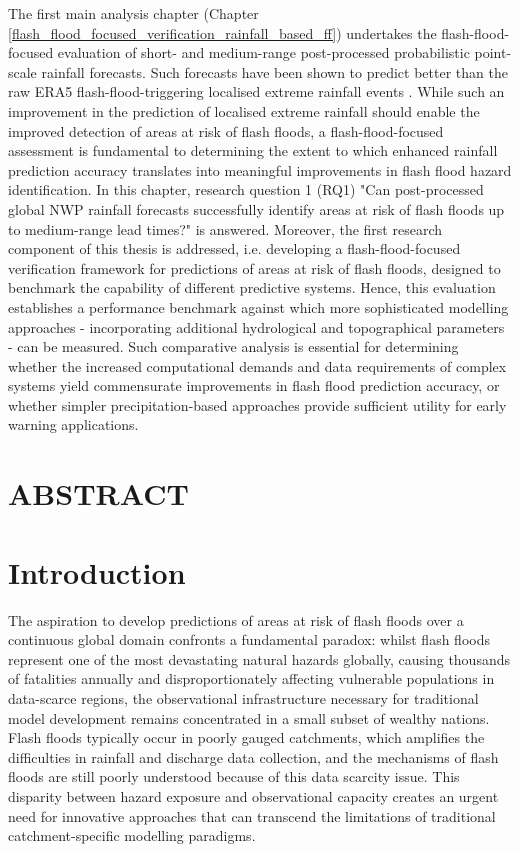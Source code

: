 The first main analysis chapter (Chapter \ref{flash_flood_focused_verification_rainfall_based_ff}) undertakes the flash-flood-focused evaluation of short- and medium-range post-processed probabilistic point-scale rainfall forecasts. Such forecasts have been shown to predict better than the raw ERA5 flash-flood-triggering localised extreme rainfall events \citep{Pillosu_2025a}. While such an improvement in the prediction of localised extreme rainfall should enable the improved detection of areas at risk of flash floods, a flash-flood-focused assessment is fundamental to determining the extent to which enhanced rainfall prediction accuracy translates into meaningful improvements in flash flood hazard identification. In this chapter, \textcolor{colour_chapter7}{research question 1 (RQ1) "Can post-processed global NWP rainfall forecasts successfully identify areas at risk of flash floods up to medium-range lead times?"} is answered. Moreover, the first research component of this thesis is addressed, i.e. \textcolor{colour_chapter5}{developing a flash-flood-focused verification framework for predictions of areas at risk of flash floods, designed to benchmark the capability of different predictive systems}. Hence, this evaluation establishes a performance benchmark against which more sophisticated modelling approaches - incorporating additional hydrological and topographical parameters - can be measured. Such comparative analysis is essential for determining whether the increased computational demands and data requirements of complex systems yield commensurate improvements in flash flood prediction accuracy, or whether simpler precipitation-based approaches provide sufficient utility for early warning applications.

\clearpage

\section*{ABSTRACT}

\clearpage



\section{Introduction}

The aspiration to develop predictions of areas at risk of flash floods over a continuous global domain confronts a fundamental paradox: whilst flash floods represent one of the most devastating natural hazards globally, causing thousands of fatalities annually and disproportionately affecting vulnerable populations in data-scarce regions, the observational infrastructure necessary for traditional model development remains concentrated in a small subset of wealthy nations. Flash floods typically occur in poorly gauged catchments, which amplifies the difficulties in rainfall and discharge data collection, and the mechanisms of flash floods are still poorly understood because of this data scarcity issue. This disparity between hazard exposure and observational capacity creates an urgent need for innovative approaches that can transcend the limitations of traditional catchment-specific modelling paradigms.

